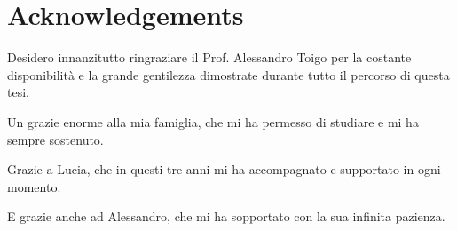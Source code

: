 \documentclass{Configuration_Files/PoliMi3i_thesis}
\begin{document}


\chapter*{Acknowledgements}
Desidero innanzitutto ringraziare il Prof. Alessandro Toigo per la costante disponibilità e la grande gentilezza dimostrate durante tutto il percorso di questa tesi.

Un grazie enorme alla mia famiglia, che mi ha permesso di studiare e mi ha sempre sostenuto.

Grazie a Lucia, che in questi tre anni mi ha accompagnato e supportato in ogni momento.

E grazie anche ad Alessandro, che mi ha sopportato con la sua infinita pazienza.
\cleardoublepage
\end{document}
